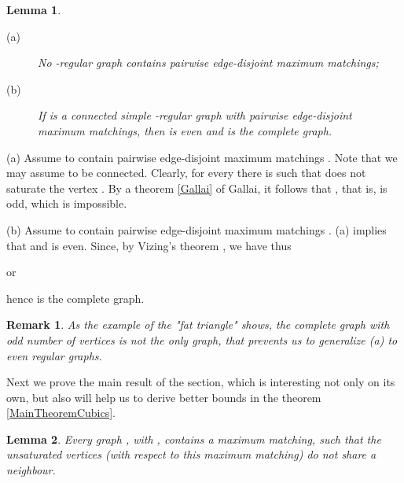 \documentclass[fleqn,12pt,twoside]{article}
\newtheorem{lemma}{Lemma}
\newtheorem{remark}{Remark}
\newenvironment{proof}[1][Proof.]{\begin{trivlist}
\item[\hskip \labelsep {\bfseries #1}]}{\end{trivlist}}
\begin{document}
\begin{lemma}
\label{OddRegulars}

\begin{description}
\item[(a)] No -regular graph  contains  pairwise
edge-disjoint maximum matchings;

\item[(b)] If  is a connected simple -regular graph with 
pairwise edge-disjoint maximum matchings, then  is even and 
is the complete graph.
\end{description}
\end{lemma}

\begin{proof}
(a) Assume  to contain  pairwise edge-disjoint maximum matchings . Note that we may assume  to be connected.
Clearly, for every  there is  such that  does not saturate the
vertex . By a theorem \ref{Gallai} of Gallai, it follows that , that is,  is odd, which is impossible.

(b) Assume  to contain  pairwise edge-disjoint maximum matchings . (a) implies that  and  is even. Since, by Vizing's theorem , we have
thus

or

hence  is the complete graph.
\end{proof}

\begin{remark}
As the example of the "fat triangle" shows, the complete graph with
odd number of vertices is not the only graph, that prevents us to
generalize (a) to even regular graphs.
\end{remark}

Next we prove the main result of the section, which is interesting
not only on its own, but also will help us to derive better bounds
in the theorem \ref{MainTheoremCubics}.

\begin{lemma}
\label{Max Matching 2-3} Every graph , with , contains a maximum matching, such that the
unsaturated vertices (with respect to this maximum matching) do not
share a neighbour.
\end{lemma}
\end{document}
